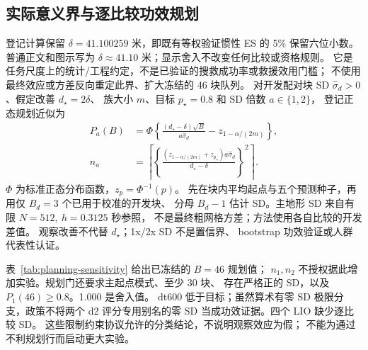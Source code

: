 \documentclass[UTF8,11pt]{ctexart}
\begin{document}
\subsection{实际意义界与逐比较功效规划}
\label{sec:planning-qualification}
登记计算保留 \(\delta=41.100259\) 米，即既有等权验证惯性 ES 的 5\% 保留六位小数。
普通正文和图示写为 \(\delta\approx41.10\) 米；显示舍入不改变任何比较或资格规则。
它是任务尺度上的统计/工程约定，不是已验证的搜救成功率或救援效用门槛；
不使用最终效应或方差反向重定此界、扩大冻结的 46 块队列。
对开发配对块 SD \(\widehat\sigma_d>0\)、假定改善 \(d_\star=2\delta\)、
族大小 \(m\)、目标 \(p_\star=0.8\) 和 SD 倍数 \(a\in\{1,2\}\)，
登记正态规划近似为
\begin{equation}
\begin{aligned}
 P_a(B)&=\Phi\left\{\frac{(d_\star-\delta)\sqrt B}{a\widehat\sigma_d}
                         -z_{1-\alpha/(2m)}\right\},\\
 n_a&=\left\lceil\left\{\frac{(z_{1-\alpha/(2m)}+z_{p_\star})a\widehat\sigma_d}
                              {d_\star-\delta}\right\}^{2}\right\rceil .
\end{aligned}
\label{eq:planning-power}
\end{equation}
\(\Phi\) 为标准正态分布函数，\(z_p=\Phi^{-1}(p)\)。
先在块内平均起点与五个预测种子，再用仅 \(B_d=3\) 个已用于校准的开发块、
分母 \(B_d-1\) 估计 SD。主地形 SD 来自有限 \(N=512,\ h=0.3125\) 秒参照，
不是最终粗网格方差；方法使用各自比较的开发差值。
观察改善不代替 \(d_\star\)；1x/2x SD 不是置信界、
bootstrap 功效验证或人群代表性认证。

表~\ref{tab:planning-sensitivity} 给出已冻结的 \(B=46\) 规划值；
\(n_1,n_2\) 不授权据此增加实验。规划门还要求主起点模式、至少 30 块、
存在严格正的 SD，以及 \(P_1(46)\geq0.8\)。1.000 是舍入值。
dt600 低于目标；虽然算术有零 SD 极限分支，政策不将两个 d2
评分专用别名的零 SD 当成功效证据。四个 LIO 缺少逐比较 SD。
这些限制约束协议允许的分类结论，不说明观察效应为假；
不能为通过不利规划行而启动更大实验。
\end{document}
